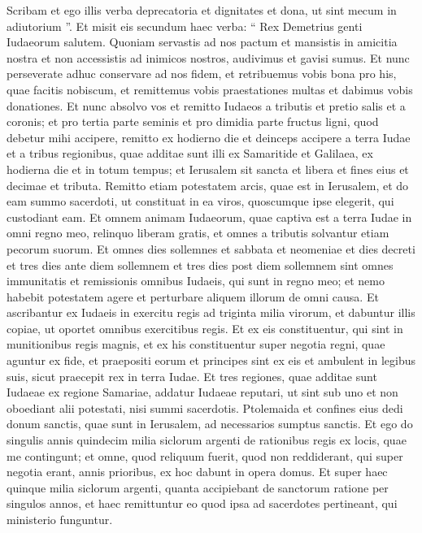 \begin{biblechapter}
\begin{biblechapter}
\begin{biblechapter}
\begin{biblechapter}
\begin{biblechapter}
\begin{biblechapter}
\begin{biblechapter}
\begin{biblechapter}
\begin{biblechapter}
\begin{biblechapter}
\verse Scribam et ego illis verba deprecatoria et dignitates et dona, ut sint mecum in adiutorium ”. 
\verse Et misit eis secundum haec verba: “ Rex Demetrius genti Iudaeorum salutem. 
\verse Quoniam servastis ad nos pactum et mansistis in amicitia nostra et non accessistis ad inimicos nostros, audivimus et gavisi sumus. 
\verse Et nunc perseverate adhuc conservare ad nos fidem, et retribuemus vobis bona pro his, quae facitis nobiscum, 
\verse et remittemus vobis praestationes multas et dabimus vobis donationes. 
\verse Et nunc absolvo vos et remitto Iudaeos a tributis et pretio salis et a coronis; 
 \verse et pro tertia parte seminis et pro dimidia parte fructus ligni, quod debetur mihi accipere, remitto ex hodierno die et deinceps accipere a terra Iudae et a tribus regionibus, quae additae sunt illi ex Samaritide et Galilaea, ex hodierna die et in totum tempus; 
\verse et Ierusalem sit sancta et libera et fines eius et decimae et tributa. 
 \verse Remitto etiam potestatem arcis, quae est in Ierusalem, et do eam summo sacerdoti, ut constituat in ea viros, quoscumque ipse elegerit, qui custodiant eam. 
\verse Et omnem animam Iudaeorum, quae captiva est a terra Iudae in omni regno meo, relinquo liberam gratis, et omnes a tributis solvantur etiam pecorum suorum. 
\verse Et omnes dies sollemnes et sabbata et neomeniae et dies decreti et tres dies ante diem sollemnem et tres dies post diem sollemnem sint omnes immunitatis et remissionis omnibus Iudaeis, qui sunt in regno meo; 
\verse et nemo habebit potestatem agere et perturbare aliquem illorum de omni causa. 
 \verse Et ascribantur ex Iudaeis in exercitu regis ad triginta milia virorum, et dabuntur illis copiae, ut oportet omnibus exercitibus regis. 
\verse Et ex eis constituentur, qui sint in munitionibus regis magnis, et ex his constituentur super negotia regni, quae aguntur ex fide, et praepositi eorum et principes sint ex eis et ambulent in legibus suis, sicut praecepit rex in terra Iudae. 
\verse Et tres regiones, quae additae sunt Iudaeae ex regione Samariae, addatur Iudaeae reputari, ut sint sub uno et non oboediant alii potestati, nisi summi sacerdotis. 
\verse Ptolemaida et confines eius dedi donum sanctis, quae sunt in Ierusalem, ad necessarios sumptus sanctis. 
\verse Et ego do singulis annis quindecim milia siclorum argenti de rationibus regis ex locis, quae me contingunt; 
\verse et omne, quod reliquum fuerit, quod non reddiderant, qui super negotia erant, annis prioribus, ex hoc dabunt in opera domus. 
\verse Et super haec quinque milia siclorum argenti, quanta accipiebant de sanctorum ratione per singulos annos, et haec remittuntur eo quod ipsa ad sacerdotes pertineant, qui ministerio funguntur. 

\end{biblechapter}
\end{biblechapter}
\end{biblechapter}
\end{biblechapter}
\end{biblechapter}
\end{biblechapter}
\end{biblechapter}
\end{biblechapter}
\end{biblechapter}
\end{biblechapter}
